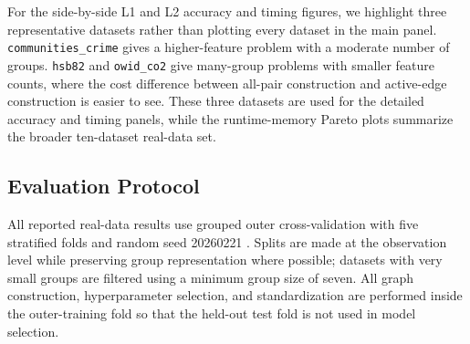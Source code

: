 \documentclass[twoside,11pt]{article}
\begin{document}
For the side-by-side L1 and L2 accuracy and timing figures, we highlight
three representative datasets rather than plotting every dataset in the main
panel. \texttt{communities\_crime} gives a higher-feature problem with a
moderate number of groups. \texttt{hsb82} and \texttt{owid\_co2} give
many-group problems with smaller feature counts, where the cost difference
between all-pair construction and active-edge construction is easier to see.
These three datasets are used for the detailed accuracy and timing panels,
while the runtime-memory Pareto plots summarize the broader ten-dataset
real-data set.

\subsection{Evaluation Protocol}

All reported real-data results use grouped outer cross-validation with five
stratified folds and random seed 20260221
\citep{kohavi1995cross,varma2006bias}. Splits are made at the observation
level while preserving group representation where possible; datasets with
very small groups are filtered using a minimum group size of seven. All graph
construction, hyperparameter selection, and standardization are performed
inside the outer-training fold so that the held-out test fold is not used in
model selection.
\end{document}
